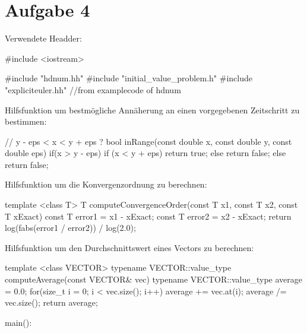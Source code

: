 \documentclass[10pt,oneside,a4paper]{scrartcl}
\begin{document}
    \section*{Aufgabe 4}

    Verwendete Headder:
        
\begin{cppcode}
#include <iostream>

#include "hdnum.hh"
#include "initial_value_problem.h"
#include "expliciteuler.hh"          //from examplecode of hdnum
    \end{cppcode}
    
    Hilfsfunktion um bestmögliche Annäherung an einen vorgegebenen Zeitschritt
    zu bestimmen:
    
    \begin{cppcode}
// y - eps < x < y + eps ?
bool inRange(const double x, const double y, const double eps) {
    if(x > y - eps) {
        if (x < y + eps) {
            return true;
        } else {
            return false;
        }
    } else {
        return false;
    }
}
    \end{cppcode}
    
    Hilfsfunktion um die Konvergenzordnung zu berechnen:
    
    \begin{cppcode}
template <class T>
T computeConvergenceOrder(const T x1, const T x2, const T xExact) {
  const T error1 = x1 - xExact;
  const T error2 = x2 - xExact;
  return log(fabs(error1 / error2)) / log(2.0);
}
    \end{cppcode}
    
    Hilfsfunktion um den Durchschnittswert eines Vectors zu berechnen:
    
    \begin{cppcode}
template <class VECTOR>
typename VECTOR::value_type computeAverage(const VECTOR& vec) {
  typename VECTOR::value_type average = 0.0;
  for(size_t i = 0; i < vec.size(); i++) {
    average += vec.at(i);
  }
  average /= vec.size();
  return average;
}
    \end{cppcode}
    
    main():
    
\end{document}
